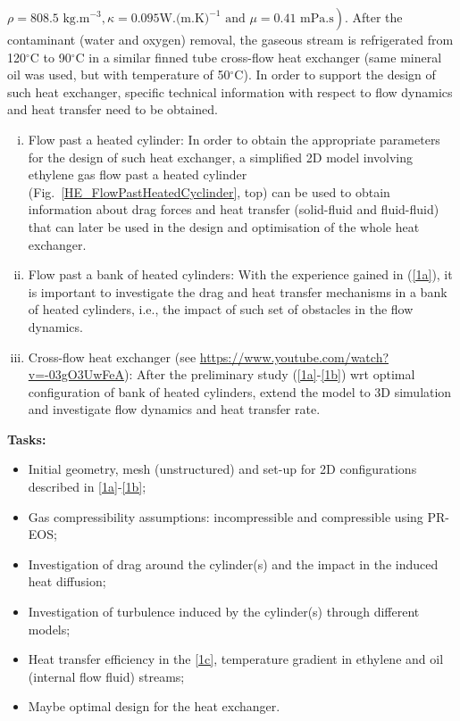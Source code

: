 \documentclass[12pts,a4paper,amsmath,amssymb,floatfix]{article}%
\begin{document}
$\left.\rho= 808.5\text{ kg.m}^{-3}, \kappa=0.095\text{W.(m.K)}^{-1}\text{ and }\mu=0.41\text{ mPa.s}\right)$. After the contaminant (water and oxygen) removal, the gaseous stream is refrigerated from 120$^{\circ}$C to 90$^{\circ}$C in a similar finned tube cross-flow heat exchanger (same mineral oil was used, but with temperature of 50$^{\circ}$C).  In order to support the design of such heat exchanger, specific technical information with respect to flow dynamics and heat transfer need to be obtained.
     \begin{enumerate}[i)]
        \item\label{1a} Flow past a heated cylinder: In order to obtain the appropriate parameters for the design of such heat exchanger, a simplified 2D model involving ethylene gas flow past a heated cylinder (Fig.~\ref{HE_FlowPastHeatedCyclinder}, top) can be used to obtain information about drag forces and heat transfer (solid-fluid and fluid-fluid) that can later be used in the design and optimisation of the whole heat exchanger. 
        \item\label{1b} Flow past a bank of heated cylinders: With the experience gained in (\ref{1a}), it is important to investigate the drag and heat transfer mechanisms in a bank of heated cylinders, i.e., the impact of such set of obstacles in the flow dynamics.
        \item\label{1c} Cross-flow heat exchanger (see \href{https://www.youtube.com/watch?v=-03gO3UwFeA}{https://www.youtube.com/watch?v=-03gO3UwFeA}): After the preliminary study (\ref{1a}-\ref{1b}) wrt optimal configuration of bank of heated cylinders, extend the model to 3D simulation and investigate flow dynamics and heat transfer rate.
     \end{enumerate}

     {\bf Tasks:}
     \begin{itemize}
        \item Initial geometry, mesh (unstructured) and set-up for 2D configurations described in \ref{1a}-\ref{1b};
        \item Gas compressibility assumptions: incompressible and compressible using PR-EOS;
        \item Investigation of drag around the cylinder(s) and the impact in the induced heat diffusion;
        \item Investigation of turbulence induced by the cylinder(s) through different models;
        \item Heat transfer efficiency in the \ref{1c}, temperature gradient in ethylene and oil (internal flow fluid) streams;
        \item Maybe optimal design for the heat exchanger.
     \end{itemize}
\end{document}
